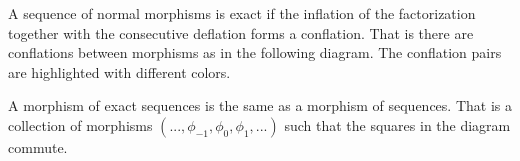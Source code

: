     \begin{definition}
        A sequence of normal morphisms is exact if the inflation of the factorization together with the consecutive deflation forms a conflation. That is there are conflations between morphisms as in the following diagram. The conflation pairs are highlighted with different colors.

        \begin{center}
        \end{center}

        A morphism of exact sequences is the same as a morphism of sequences. That is a collection of morphisms $(...,\phi_{-1},\phi_0,\phi_1,...)$ such that the squares in the diagram commute.

        \begin{center}
        \end{center}
    \end{definition}

